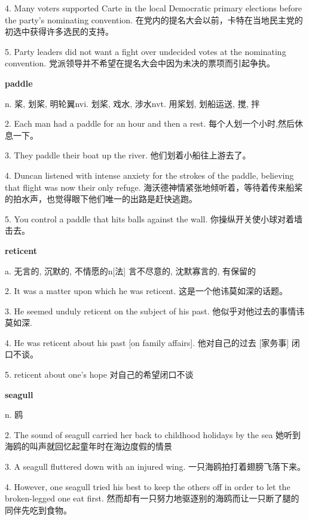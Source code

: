 \documentclass[12pt]{book}
\begin{document}
4.  Many voters supported Carte in the local Democratic primary elections before the party's nominating convention.  在党内的提名大会以前，卡特在当地民主党的初选中获得许多选民的支持。 


5.  Party leaders did not want a fight over undecided votes at the nominating convention.  党派领导并不希望在提名大会中因为未决的票项而引起争执。 


\vspace{12pt}

\textbf{paddle}

n. 桨, 划桨, 明轮翼nvi. 划桨, 戏水, 涉水nvt. 用桨划, 划船运送, 搅, 拌

2.  Each man had a paddle for an hour and then a rest.  每个人划一个小时,然后休息一下。 


3.  They paddle their boat up the river.  他们划着小船往上游去了。 


4.  Duncan listened with intense anxiety for the strokes of the paddle, believing that flight was now their only refuge.  海沃德神情紧张地倾听着，等待着传来船桨的拍水声，也觉得眼下他们唯一的出路是赶快逃跑。 


5.  You control a paddle that hits balls against the wall.  你操纵开关使小球对着墙击去。 


\vspace{12pt}

\textbf{reticent}

a. 无言的, 沉默的, 不情愿的n[法] 言不尽意的, 沈默寡言的, 有保留的

2.  It was a matter upon which he was reticent.  这是一个他讳莫如深的话题。 


3.  He seemed unduly reticent on the subject of his past.  他似乎对他过去的事情讳莫如深. 


4.  He was reticent about his past [on family affairs].  他对自己的过去 [家务事] 闭口不谈。 


5.  reticent about one's hope  对自己的希望闭口不谈 


\vspace{12pt}

\textbf{seagull}

n. 鸥

2.  The sound of seagull carried her back to childhood holidays by the sea  她听到海鸥的叫声就回忆起童年时在海边度假的情景 


3.  A seagull fluttered down with an injured wing.  一只海鸥拍打着翅膀飞落下来。 


4.  However, one seagull tried his best to keep the others off in order to let the broken-legged one eat first.  然而却有一只努力地驱逐别的海鸥而让一只断了腿的同伴先吃到食物。 
\end{document}
